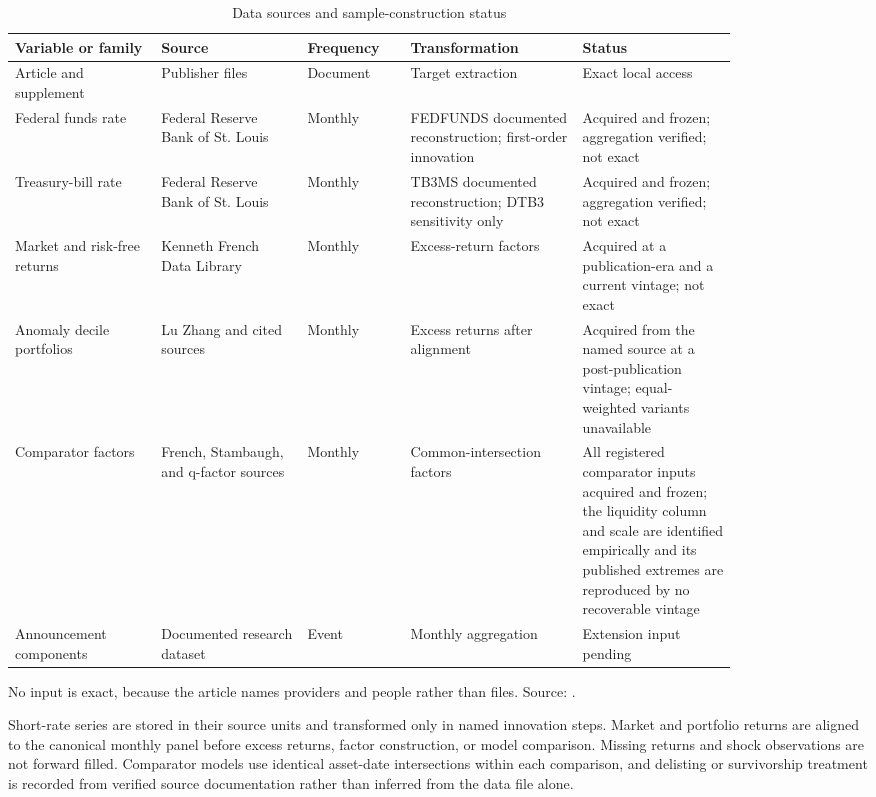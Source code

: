 \documentclass[11pt]{article}
\newcommand{\artifact}[1]{\path{#1}}
\begin{document}
\begin{table}[htbp]
\centering
\caption{Data sources and sample-construction status}
\small
\begin{tabular}{p{0.17\linewidth}p{0.17\linewidth}p{0.12\linewidth}p{0.20\linewidth}p{0.18\linewidth}}
\toprule
Variable or family & Source & Frequency & Transformation & Status \\
\midrule
Article and supplement & Publisher files & Document & Target extraction & Exact local access \\
Federal funds rate & Federal Reserve Bank of St. Louis & Monthly & FEDFUNDS documented reconstruction; first-order innovation & Acquired and frozen; aggregation verified; not exact \\ %
Treasury-bill rate & Federal Reserve Bank of St. Louis & Monthly & TB3MS documented reconstruction; DTB3 sensitivity only & Acquired and frozen; aggregation verified; not exact \\ %
Market and risk-free returns & Kenneth French Data Library & Monthly & Excess-return factors & Acquired at a publication-era and a current vintage; not exact \\ %
Anomaly decile portfolios & Lu Zhang and cited sources & Monthly & Excess returns after alignment & Acquired from the named source at a post-publication vintage; equal-weighted variants unavailable \\ %
Comparator factors & French, Stambaugh, and q-factor sources & Monthly & Common-intersection factors & All registered comparator inputs acquired and frozen; the liquidity column and scale are identified empirically and its published extremes are reproduced by no recoverable vintage \\ %
Announcement components & Documented research dataset & Event & Monthly aggregation & Extension input pending \\
\bottomrule
\end{tabular}

\smallskip
\small No input is exact, because the article names providers and people rather than files. Source: \artifact{research/data_access_matrix.csv}.
\end{table}

Short-rate series are stored in their source units and transformed only in named
innovation steps. Market and portfolio returns are aligned to the canonical
monthly panel before excess returns, factor construction, or model comparison.
Missing returns and shock observations are not forward filled. Comparator models
use identical asset-date intersections within each comparison, and delisting or
survivorship treatment is recorded from verified source documentation rather
than inferred from the data file alone.
\end{document}
